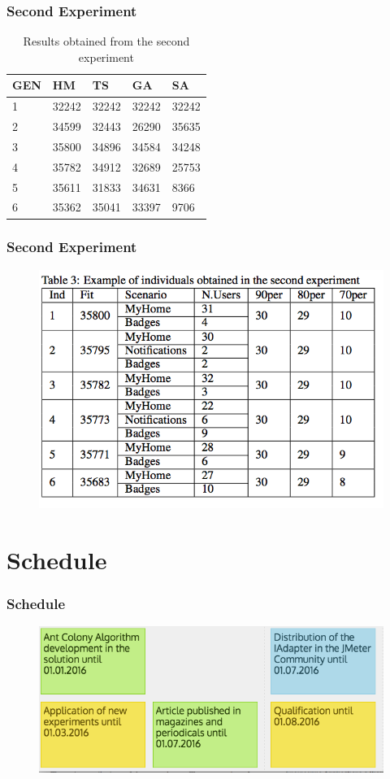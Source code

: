 \documentclass{beamer}
\begin{document}
\begin{frame}[allowframebreaks]
\frametitle{Second Experiment}
\begin{table}[h]
\centering
\caption{Results obtained from the second experiment}
\label{tab:secondexperiment}
\begin{tabular}{|l|l|l|l|l|}
\hline
GEN & HM    & TS    & GA    & SA    \\
\hline
1          & 32242 & 32242 & 32242 & 32242 \\
\hline
2          & 34599 & 32443 & 26290 & 35635 \\
\hline
3          & 35800 & 34896 & 34584 & 34248 \\
\hline
4          & 35782 & 34912 & 32689 & 25753 \\
\hline
5          & 35611 & 31833 & 34631 & 8366  \\
\hline
6          & 35362 & 35041 & 33397 & 9706 \\
\hline
\end{tabular}
\end{table}
\end{frame}

\begin{frame}
\frametitle{Second Experiment}
\begin{figure}[H]
\centering
\includegraphics[width=0.8\linewidth]{ind1.PNG}
\end{figure}
\end{frame}

\section{Schedule}

\begin{frame}
\frametitle{Schedule}
\begin{figure}[H]
\centering
\includegraphics[width=1\linewidth]{stories1.PNG}
\end{figure}
\end{frame}
\end{document}
